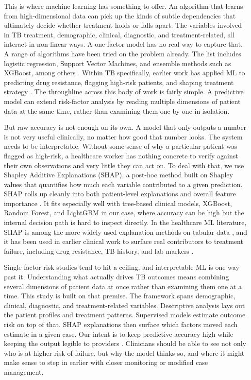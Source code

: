 \documentclass[12pt]{article}
\renewcommand{\_}{\textunderscore\allowbreak}
\begin{document}
This is where machine learning has something to offer. An algorithm that learns from high-dimensional data can pick up the kinds of subtle dependencies that ultimately decide whether treatment holds or falls apart. The variables involved in TB treatment, demographic, clinical, diagnostic, and treatment-related, all interact in non-linear ways. A one-factor model has no real way to capture that. A range of algorithms have been tried on the problem already. The list includes logistic regression, Support Vector Machines, and ensemble methods such as XGBoost, among others \citep{ref16}. Within TB specifically, earlier work has applied ML to predicting drug resistance, flagging high-risk patients, and shaping treatment strategy \citep{ref26, ref27}. The throughline across this body of work is fairly simple. A predictive model can extend risk-factor analysis by reading multiple dimensions of patient data at the same time, rather than examining them one by one in isolation.

But raw accuracy is not enough on its own. A model that only outputs a number is not very useful clinically, no matter how good that number looks. The system needs to be interpretable. Without some sense of why a particular patient was flagged as high-risk, a healthcare worker has nothing concrete to verify against their own observations and very little they can act on. To deal with that, we use Shapley Additive Explanations (SHAP), a post-hoc method built on Shapley values that quantifies how much each variable contributed to a given prediction. SHAP rolls up cleanly into both patient-level explanations and overall feature importance \citep{lundberg2017unified,lundberg2020local}. It fits especially well with tree-based clinical models, XGBoost, Random Forest, and LightGBM in our case, where accuracy can be high but the internal decision path is hard to inspect directly. In the healthcare ML literature, SHAP is among the more widely used explanation methods on tabular data \citep{allgaier2023model}, and it has been used in earlier clinical work to surface real contributors to treatment failure, including drug resistance, TB history, and lab markers \citep{ref15,wang2025biochemical,sibanda2026explainable}.

Single-factor risk studies tend to hit a ceiling, and interpretable ML is one way past it. Understanding what actually drives TB outcomes means combining several dimensions of patient data at once rather than examining them one at a time. This study is built on that premise. The framework spans demographic, clinical, diagnostic, and treatment-related variables. Descriptive analysis lays out the patient profiles and treatment patterns. Supervised models estimate outcome risk on top of that. SHAP explanations then surface which factors moved each estimate in a given case. Our intent is to keep predictive accuracy high while keeping the output legible to providers \citep{ref23, ref24}. Clinicians should be able to see not only who is at higher risk of failure, but why the model thinks so, and where it might make sense to step in earlier with closer monitoring or modified case management.
\end{document}
